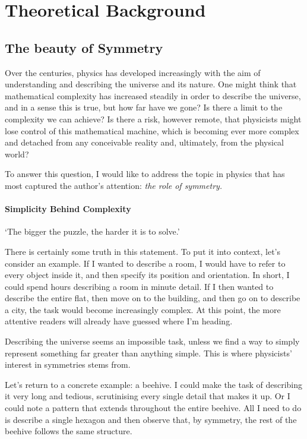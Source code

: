 \chapter{Theoretical Background}
\label{ch:theory}
\section{The beauty of Symmetry}

Over the centuries, physics has developed increasingly with the aim of understanding and describing the universe and its nature. One might think that mathematical complexity has increased steadily in order to describe the universe, and in a sense this is true, but how far have we gone? Is there a limit to the complexity we can achieve? Is there a risk, however remote, that physicists might lose control of this mathematical machine, which is becoming ever more complex and detached from any conceivable reality and, ultimately, from the physical world?

\noindent To answer this question, I would like to address the topic in physics that has most captured the author's attention: \textit{the role of symmetry.}


\subsubsection{Simplicity Behind Complexity}
\begin{center}
    `The bigger the puzzle, the harder it is to solve.'
\end{center}

There is certainly some truth in this statement. To put it into context, let's consider an example. If I wanted to describe a room, I would have to refer to every object inside it, and then specify its position and orientation. In short, I could spend hours describing a room in minute detail. If I then wanted to describe the entire flat, then move on to the building, and then go on to describe a city, the task would become increasingly complex. At this point, the more attentive readers will already have guessed where I'm heading.

Describing the universe seems an impossible task, unless we find a way to simply represent something far greater than anything simple. This is where physicists' interest in symmetries stems from.

Let's return to a concrete example: a beehive. I could make the task of describing it very long and tedious, scrutinising every single detail that makes it up. Or I could note a pattern that extends throughout the entire beehive. All I need to do is describe a single hexagon and then observe that, by symmetry, the rest of the beehive follows the same structure.

